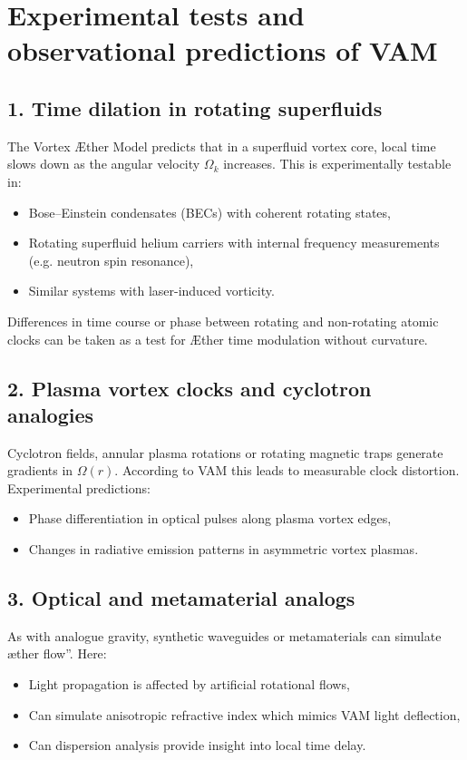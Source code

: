 \section{Experimental tests and observational predictions of VAM}

\subsection{1. Time dilation in rotating superfluids}

The Vortex Æther Model predicts that in a superfluid vortex core, local time slows down as the angular velocity $\Omega_k$ increases. This is experimentally testable in:
\begin{itemize}
    \item Bose–Einstein condensates (BECs) with coherent rotating states,
    \item Rotating superfluid helium carriers with internal frequency measurements (e.g. neutron spin resonance),
    \item Similar systems with laser-induced vorticity.
\end{itemize}

Differences in time course or phase between rotating and non-rotating atomic clocks can be taken as a test for Æther time modulation without curvature.~\cite{Steinhauer2016}

\subsection{2. Plasma vortex clocks and cyclotron analogies}

Cyclotron fields, annular plasma rotations or rotating magnetic traps generate gradients in $\Omega(r)$. According to VAM this leads to measurable clock distortion. Experimental predictions:
\begin{itemize}
    \item Phase differentiation in optical pulses along plasma vortex edges,~\cite{Unruh1981}
    \item Changes in radiative emission patterns in asymmetric vortex plasmas.
\end{itemize}

\subsection{3. Optical and metamaterial analogs}

As with analogue gravity, synthetic waveguides or metamaterials can simulate \grqq æther flow\textquotedblright. Here:
\begin{itemize}
    \item Light propagation is affected by artificial rotational flows,
    \item Can simulate anisotropic refractive index which mimics VAM light deflection,
    \item Can dispersion analysis provide insight into local time delay.
\end{itemize}

